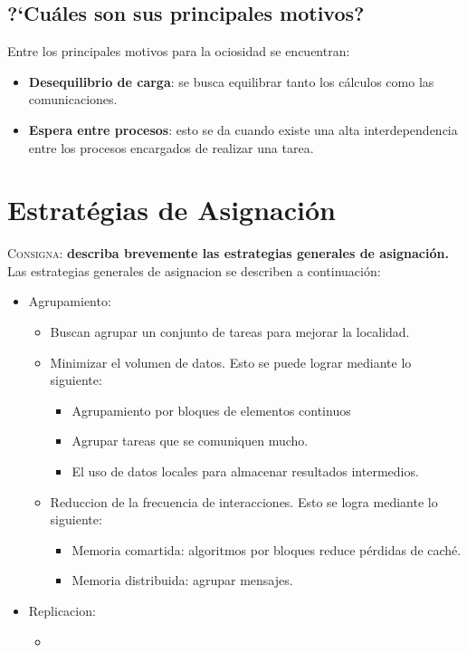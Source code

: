 \documentclass{article}
\begin{document}
\subsection{?`Cu\'ales son sus principales motivos?}
Entre los principales motivos para la ociosidad se encuentran:
\begin{itemize}
\item \textbf{Desequilibrio de carga}: se busca equilibrar tanto los
c\'alculos como las comunicaciones.
\item \textbf{Espera entre procesos}: esto se da cuando existe una alta
interdependencia entre los procesos encargados de realizar una tarea.
\end{itemize}

\section{Estrat\'egias de Asignaci\'on}
\textsc{Consigna}: \textbf{describa brevemente las estrategias generales de
asignaci\'on.}\\

Las estrategias generales de asignacion se describen a continuaci\'on:
\begin{itemize}
\item Agrupamiento:
	\begin{itemize}
	\item Buscan agrupar un conjunto de tareas para mejorar la localidad.
	\item Minimizar el volumen de datos.
	Esto se puede lograr mediante lo siguiente:
		\begin{itemize}
		\item Agrupamiento por bloques de elementos continuos
		\item Agrupar tareas que se comuniquen mucho.
		\item El uso de datos locales para almacenar resultados
intermedios.
		\end{itemize}
	\item Reduccion de la frecuencia de interacciones.
	Esto se logra mediante lo siguiente:
		\begin{itemize}
		\item Memoria comartida: algoritmos por bloques reduce
p\'erdidas de cach\'e.
		\item Memoria distribuida: agrupar mensajes.
		\end{itemize}
	\end{itemize}
\item Replicacion:
	\begin{itemize}
	\item
	\end{itemize}
\end{itemize}
\end{document}

